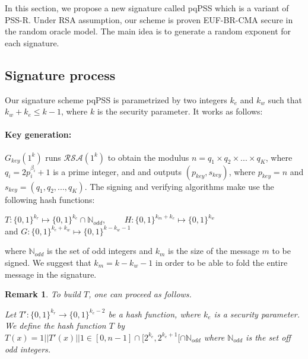 \documentclass[a4paper,11pt]{article}
\newtheorem{remark}[theorem]{Remark}
\begin{document}
In this section,  we propose a new signature called pqPSS which is a variant of PSS-R. Under RSA
assumption, our scheme is proven EUF-BR-CMA secure in the random oracle model. The main idea is to generate a random exponent for each signature.

\subsection{Signature process}\label{sec:two:1}
Our signature scheme pqPSS is parametrized by two integers $k_e$ and $k_w$ such that $k_w+k_e \leq k-1$, where $k$ is the security parameter. It works as follows:
 \vspace{0.2cm}

\paragraph{Key generation:}  $G_{key}(1^{k})$ runs $\mathcal{R}\mathcal{S}\mathcal{A}(1^k)$ to obtain the modulus $n=q_1\times q_2\times ...\times q_K$, where $q_i=2p_i^{\beta _i}+1$ is a prime integer, and  and outputs $(p_{key},s_{key})$, where $p_{key}=n$ and $s_{key}=(q_1,q_2,...,q_K)$. The signing and verifying algorithms make use the following hash functions:\\
\begin{center}
$T:\{0,1\}^{k_r}\stackrel{}{\longmapsto}\{0,1\}^{k_e}\cap \mathbb{N}_{odd}$, \ \ \ \ $H:\{0,1\}^{k_m+k_e}\stackrel{}{\longmapsto}\{0,1\}^{k_w}$ \\ and $G:\{0,1\}^{k_e+k_w}\stackrel{}{\longmapsto}\{0,1\}^{k-k_w-1}$
\end{center}
where $\mathbb{N}_{odd}$ is the set of odd integers and $k_m$ is the size of the message $m$ to be signed. We suggest that $k_m=k-k_w-1$ in order to be able to fold the entire message in the signature.


\begin{remark} To build $T$, one can proceed as follows.

Let $ T': \{0, 1\}^{k_{r}} \rightarrow  \{0,1\}^{k_{e}-2}$ be a hash function, where $k_{e}$ is a security parameter. We
define the hash function  $T$  by $T(x)=1||T'(x)||1 \in [0, n-1] \cap [ 2^{k_{e}}, 2^{k_{e}+1}[\cap \mathbb{N}_{odd} $ where $\mathbb{N}_{odd} $ is the set off odd integers.
\end{remark}
\end{document}
